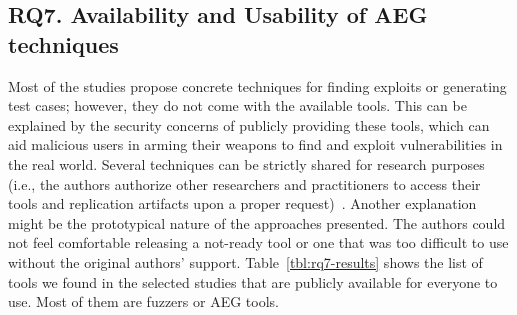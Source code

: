 \subsection{RQ7. Availability and Usability of AEG techniques}
\label{sub:rq7-results}

Most of the studies propose concrete techniques for finding exploits or generating test cases; however, they do not come with the available tools. This can be explained by the security concerns of publicly providing these tools, which can aid malicious users in arming their weapons to find and exploit vulnerabilities in the real world.
Several techniques can be strictly shared for research purposes (i.e., the authors authorize other researchers and practitioners to access their tools and replication artifacts upon a proper request)~\cite{Appelt2014259, Xu2022, Garcia2017661}.
Another explanation might be the prototypical nature of the approaches presented. The authors could not feel comfortable releasing a not-ready tool or one that was too difficult to use without the original authors' support.
%
Table~\ref{tbl:rq7-results} shows the list of tools we found in the selected studies that are publicly available for everyone to use. Most of them are fuzzers or AEG tools.


